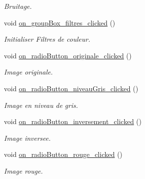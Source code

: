 \begin{DoxyCompactItemize}
\begin{DoxyCompactList}\small\item\em Bruitage. \end{DoxyCompactList}\item 
\mbox{\label{classMainWindow_a5358808e6910fab1d30a8a5215e29ae7}} 
void \hyperlink{classMainWindow_a5358808e6910fab1d30a8a5215e29ae7}{on\+\_\+group\+Box\+\_\+filtres\+\_\+clicked} ()
\begin{DoxyCompactList}\small\item\em Initialiser Filtres de couleur. \end{DoxyCompactList}\item 
\mbox{\label{classMainWindow_ad8f6a3b5cb5accbb03bf20a0aa7c8e49}} 
void \hyperlink{classMainWindow_ad8f6a3b5cb5accbb03bf20a0aa7c8e49}{on\+\_\+radio\+Button\+\_\+originale\+\_\+clicked} ()
\begin{DoxyCompactList}\small\item\em Image originale. \end{DoxyCompactList}\item 
\mbox{\label{classMainWindow_a9eb58116f007312b8b77c997308a2290}} 
void \hyperlink{classMainWindow_a9eb58116f007312b8b77c997308a2290}{on\+\_\+radio\+Button\+\_\+niveau\+Gris\+\_\+clicked} ()
\begin{DoxyCompactList}\small\item\em Image en niveau de gris. \end{DoxyCompactList}\item 
\mbox{\label{classMainWindow_a8a4f1cd0f33bc30dc04761c2f7267f20}} 
void \hyperlink{classMainWindow_a8a4f1cd0f33bc30dc04761c2f7267f20}{on\+\_\+radio\+Button\+\_\+inversement\+\_\+clicked} ()
\begin{DoxyCompactList}\small\item\em Image inversee. \end{DoxyCompactList}\item 
\mbox{\label{classMainWindow_a9d571dd0b7fc606e4881e237a720d295}} 
void \hyperlink{classMainWindow_a9d571dd0b7fc606e4881e237a720d295}{on\+\_\+radio\+Button\+\_\+rouge\+\_\+clicked} ()
\begin{DoxyCompactList}\small\item\em Image rouge. \end{DoxyCompactList}\item 

\end{DoxyCompactItemize}

